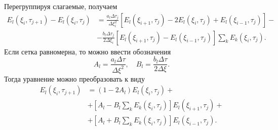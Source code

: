 \documentclass{hedwork}
\begin{document}
    Перегруппируя слагаемые, получаем
    \begin{align*}
        E_l(\xi_i, \tau_{j+1}) - E_l(\xi_i, \tau_j) & =
        \frac{a_l\Delta\tau_j}{\Delta\xi_i^2}
        [E_l(\xi_{i+1}, \tau_j) - 2E_l(\xi_i, \tau_j) + E_l(\xi_{i-1}, \tau_j)]
        -\\
        & - \frac{b_l\Delta\tau_j}{2\Delta\xi_i}
        [E_l(\xi_{i+1}, \tau_j) - E_l(\xi_{i-1}, \tau_j)]
        \sum_k E_k(\xi_i, \tau_j).
    \end{align*}
    Если сетка равномерна, то можно ввести обозначения
    \[
        A_l = \frac{a_l \Delta\tau}{\Delta\xi^2},\quad
        B_l = \frac{b_l\Delta\tau}{2\Delta\xi}.
    \]
    Тогда уравнение можно преобразовать к виду
    \begin{align*}
        E_l(\xi_i, \tau_{j+1}) & = (1-2A_l)E_l(\xi_i, \tau_j) +\\
        & +
            \left[A_l - B_l\sum_k E_k(\xi_i,\tau_j)\right]E_l(\xi_{i+1},\tau_j)
          + \\
        & +
            \left[A_l + B_l\sum_k E_k(\xi_i,\tau_j)\right]E_l(\xi_{i-1},\tau_j).
    \end{align*}
\end{document}
